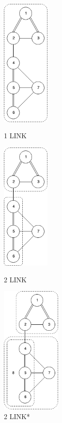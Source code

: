 \documentclass[12pt]{book}
\begin{document}
\begin{figure}[htbp]
	\centering
	\begin{minipage}[t]{0.32\textwidth}
	\centering
	\includegraphics[height=6.4cm]{Figure/Figure7_4.png}
	\caption{1 LINK}
	\end{minipage}
	\begin{minipage}[t]{0.32\textwidth}
		\centering
		\includegraphics[height=6.4cm]{Figure/Figure7_5.png}
		\caption{2 LINK}
	\end{minipage}
	\begin{minipage}[t]{0.32\textwidth}
	\centering
	\includegraphics[height=6.4cm]{Figure/Figure7_6.png}
	\caption{2 LINK*}
	\end{minipage}
\end{figure}
\end{document}

